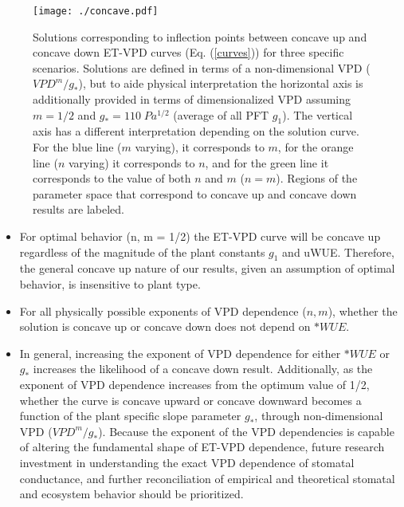 \begin{figure}
  \centering
  \centerline{\texttt{[image: ./concave.pdf]}}
  \caption{ Solutions corresponding to inflection points between
    concave up and concave down ET-VPD curves (Eq. (\ref{curves}))
    for three specific scenarios. Solutions are defined in terms of a
    non-dimensional VPD ($VPD^m/g_*$), but to aide physical
    interpretation the horizontal axis is additionally provided in terms of dimensionalized VPD assuming $m=1/2$ and
    $g_*=110\; Pa^{1/2}$ (average of all PFT $g_1$). The vertical axis
    has a different interpretation depending on the solution
    curve. For the blue line ($m$ varying), it corresponds to $m$,
    for the orange line ($n$ varying) it corresponds to $n$, and for
    the green line it corresponds to the value of both $n$ and $m$
    ($n=m$). Regions of the parameter space that correspond to
    concave up and concave down results are labeled.}
  \label{concave}
\end{figure}

\begin{itemize}
  \item For optimal behavior (n, m = 1/2) the ET-VPD curve will be
    concave up regardless of the magnitude of the plant constants
    $g_1$ and uWUE. Therefore, the general concave up nature of our
    results, given an assumption of optimal behavior, is insensitive
    to plant type.
  \item For all physically possible exponents of VPD dependence ($n,
    m$), whether the solution is concave up or concave down does not
    depend on $*WUE$.
  \item In general, increasing the exponent of VPD dependence for
    either $*WUE$ or $g_*$ increases the likelihood of a concave down
    result. Additionally, as the exponent of VPD dependence increases
    from the optimum value of 1/2, whether the curve is concave upward
    or concave downward becomes a function of the plant specific slope
    parameter $g_*$, through non-dimensional VPD
    ($VPD^m/g_*$). Because the exponent of the VPD dependencies is
    capable of altering the fundamental shape of ET-VPD dependence,
    future research investment in understanding the exact VPD
    dependence of stomatal conductance, and further reconciliation of
    empirical and theoretical stomatal and ecosystem behavior should
    be prioritized.
\end{itemize}

